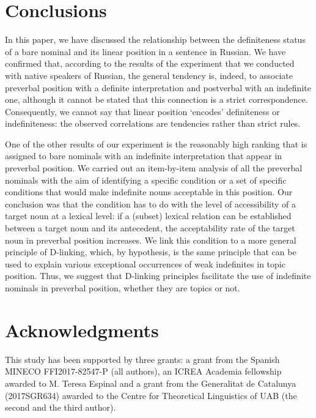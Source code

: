 \documentclass[output=paper]{langsci/langscibook}
\begin{document}
\section{Conclusions}\label{2sec:5}
In this paper, we have discussed the relationship between the definiteness status of a bare nominal and its linear position in a sentence in Russian. We have confirmed that, according to the results of the experiment that we conducted with native speakers of Russian, the general tendency is, indeed, to associate preverbal position with a definite interpretation and postverbal with an indefinite one, although it cannot be stated that this connection is a strict correspondence. Consequently, we cannot say that linear position `encodes' definiteness or indefiniteness:  the observed correlations are tendencies rather than strict rules. 

One of the other results of our experiment is the reasonably high ranking that is assigned to bare nominals with an indefinite interpretation that appear in preverbal position. We carried out an item-by-item analysis of all the preverbal nominals with the aim of identifying a specific condition or a set of specific conditions that would make indefinite nouns acceptable in this position. Our conclusion was that the condition has to do with the level of accessibility of a target noun at a lexical level: if a (subset) lexical relation can be established between a target noun and its antecedent, the acceptability rate of the target noun in preverbal position increases. We link this condition to a more general principle of D-linking, which, by hypothesis, is the same principle that can be used to explain various exceptional occurrences of weak indefinites in topic position. Thus, we suggest that D-linking principles facilitate the use of indefinite nominals in preverbal position, whether they are topics or not.


\section*{Acknowledgments}
{
This study has been supported by three grants: a grant from the Spanish MINECO FFI2017-82547-P (all authors), an ICREA Academia fellowship awarded to M. Te\-re\-sa Espinal and a grant from the Generalitat de Catalunya (2017SGR634) awarded to the Centre for Theoretical Linguistics of UAB (the second and the third author).
}


{\sloppy\printbibliography[heading=subbibliography,notkeyword=this]}
\end{document}
